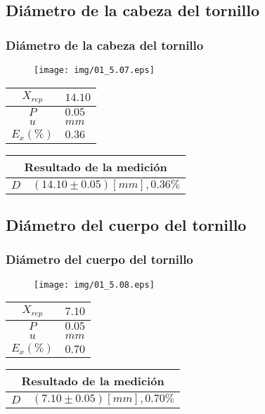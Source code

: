 \documentclass[letter,11pt]{beamer}
\begin{document}
\subsection{Diámetro de la cabeza del tornillo}
\begin{frame}
\frametitle{Diámetro de la cabeza del tornillo}
\vspace*{0.8cm}
\begin{figure}
\centering
\texttt{[image: img/01\_5.07.eps]}
\end{figure}
\vspace*{0.4cm}
\scriptsize
\begin{tabular}{|c|>{\centering}m{1.8cm}<{\centering}|}
\hline
$X_{rep}$ &  $14.10$ \tabularnewline \hline
      $P$ &   $0.05$ \tabularnewline \hline
      $u$ &     $mm$ \tabularnewline \hline
$E_x(\%)$ &   $0.36$ \tabularnewline \hline
\end{tabular}
\quad
\begin{tabular}{|c|>{\centering}m{5.7cm}<{\centering}|}
\hline
\multicolumn{2}{|c|}{\textbf{Resultado de la medición}} \\ \hline
$D$ & $( 14.10\pm0.05)[mm], 0.36\%$ \tabularnewline \hline
\end{tabular}
\end{frame}

\subsection{Diámetro del cuerpo del tornillo}
\begin{frame}
\frametitle{Diámetro del cuerpo del tornillo}
\vspace*{0.8cm}
\begin{figure}
\centering
\texttt{[image: img/01\_5.08.eps]}
\end{figure}
\vspace*{0.4cm}
\scriptsize
\begin{tabular}{|c|>{\centering}m{1.8cm}<{\centering}|}
\hline
$X_{rep}$ &   $7.10$ \tabularnewline \hline
      $P$ &   $0.05$ \tabularnewline \hline
      $u$ &     $mm$ \tabularnewline \hline
$E_x(\%)$ &   $0.70$ \tabularnewline \hline
\end{tabular}
\quad
\begin{tabular}{|c|>{\centering}m{5.7cm}<{\centering}|}
\hline
\multicolumn{2}{|c|}{\textbf{Resultado de la medición}} \\ \hline
$D$ & $(  7.10\pm0.05)[mm], 0.70\%$ \tabularnewline \hline
\end{tabular}
\end{frame}
\end{document}

